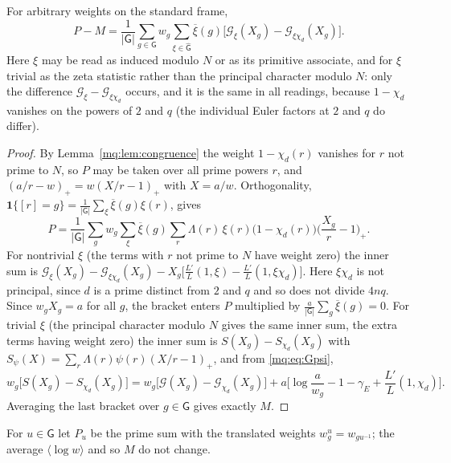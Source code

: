 \begin{theorem}\label{mq:thm:celldecomp}
For arbitrary weights on the standard frame,
\[
P-M=\frac1{|\mathsf G|}\sum_{g\in\mathsf G}w_g\sum_{\xi\in\widehat{\mathsf G}}\overline\xi(g)\Big[\mathcal G_\xi(X_g)-\mathcal G_{\xi\chi_d}(X_g)\Big].
\]
Here $\xi$ may be read as induced modulo $N$ or as its primitive associate, and for $\xi$ trivial as the zeta statistic rather than the principal character modulo $N$: only the difference $\mathcal G_\xi-\mathcal G_{\xi\chi_d}$ occurs, and it is the same in all readings, because $1-\chi_d$ vanishes on the powers of $2$ and $q$ (the individual Euler factors at $2$ and $q$ do differ).
\end{theorem}

\begin{proof}
By Lemma~\ref{mq:lem:congruence} the weight $1-\chi_d(r)$ vanishes for $r$ not prime to $N$, so $P$ may be taken over all prime powers $r$, and $(a/r-w)_+=w(X/r-1)_+$ with $X=a/w$. Orthogonality, $\mathbf 1\{[r]=g\}=\frac1{|\mathsf G|}\sum_\xi\overline\xi(g)\xi(r)$, gives
\[
P=\frac1{|\mathsf G|}\sum_gw_g\sum_\xi\overline\xi(g)\sum_r\Lambda(r)\,\xi(r)\big(1-\chi_d(r)\big)\Big(\frac{X_g}r-1\Big)_+ .
\]
For nontrivial $\xi$ (the terms with $r$ not prime to $N$ have weight zero) the inner sum is $\mathcal G_\xi(X_g)-\mathcal G_{\xi\chi_d}(X_g)-X_g\big[\frac{L'}{L}(1,\xi)-\frac{L'}{L}(1,\xi\chi_d)\big]$. Here $\xi\chi_d$ is not principal, since $d$ is a prime distinct from $2$ and $q$ and so does not divide $4nq$. Since $w_gX_g=a$ for all $g$, the bracket enters $P$ multiplied by $\frac a{|\mathsf G|}\sum_g\overline\xi(g)=0$. For trivial $\xi$ (the principal character modulo $N$ gives the same inner sum, the extra terms having weight zero) the inner sum is $S(X_g)-S_{\chi_d}(X_g)$ with $S_\psi(X)=\sum_r\Lambda(r)\psi(r)(X/r-1)_+$, and from \eqref{mq:eq:Gpsi},
\[
w_g\big[S(X_g)-S_{\chi_d}(X_g)\big]=w_g\big[\mathcal G(X_g)-\mathcal G_{\chi_d}(X_g)\big]+a\Big[\log\frac a{w_g}-1-\gamma_E+\frac{L'}L(1,\chi_d)\Big].
\]
Averaging the last bracket over $g\in\mathsf G$ gives exactly $M$.
\end{proof}

For $u\in\mathsf G$ let $P_u$ be the prime sum with the translated weights $w^u_g=w_{gu^{-1}}$; the average $\langle\log w\rangle$ and so $M$ do not change.

